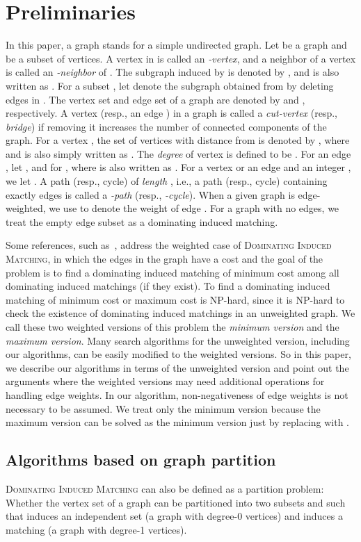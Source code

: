 \documentclass{elsart_TR2}
\begin{document}
\section{Preliminaries}
\label{sec_pre}
In this paper, a graph stands for a simple undirected graph.
Let  be a graph and  be a subset of vertices.
A vertex in  is called an \emph{-vertex},
and a neighbor  of a vertex  is called an \emph{-neighbor} of .
The subgraph induced by  is denoted by , and  is also written as .
For a subset , let  denote the subgraph obtained from  by deleting edges in .
The vertex set and edge set of a graph  are denoted by  and , respectively.
A vertex  (resp., an edge ) in a graph is called a \emph{cut-vertex} (resp., \emph{bridge})
 if removing it increases the number of connected components of the graph.
For a vertex ,  the set of vertices with distance  from  is denoted by , where  and  is also simply written as . The \emph{degree} of vertex  is defined to be .
For an edge , let ,
 and  for ,
where  is also written as .
For a vertex  or an edge  and an integer , we let .
A path (resp., cycle) of \emph{length} , i.e., a path (resp., cycle) containing exactly  edges is called
 a  \emph{-path} (resp., \emph{-cycle}).
When a given graph is  edge-weighted, we use  to denote the weight of edge .
For a graph with no edges, we treat the empty edge subset as a dominating induced matching.


Some references, such as~\cite{LMS:DIMexact},  address the weighted case of \textsc{Dominating Induced Matching}, in which the edges in the graph have a cost and the goal of the problem is to find
a dominating induced matching of minimum cost among all dominating induced matchings (if they exist). To find a dominating induced matching of minimum cost or maximum cost is NP-hard, since it is NP-hard to check the existence of dominating induced matchings in an unweighted graph. We call these two weighted versions of this problem the \emph{minimum version} and the \emph{maximum version}. Many search algorithms for the unweighted version, including our algorithms, can be easily modified to the weighted versions. So in this paper, we describe our algorithms in terms of the unweighted version and point out the arguments where the weighted versions may need additional operations for handling edge weights.
In our algorithm, non-negativeness of edge weights  is not necessary to be assumed.
We treat only the minimum version because  the maximum version can be solved
as the minimum version  just by replacing  with .


\subsection{Algorithms based on graph partition}
\textsc{Dominating Induced Matching} can also be defined as a partition problem: Whether the vertex set of a graph can be partitioned into two subsets  and  such that
  induces an independent set (a graph with  degree-0 vertices) and
  induces a matching (a graph with   degree-1 vertices).
\end{document}
